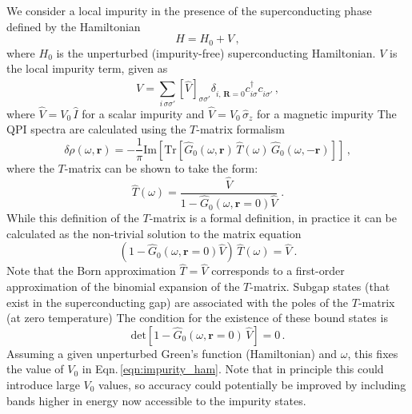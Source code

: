 \documentclass[aps,prb,twocolumn,superscriptaddress,nofootinbib]{revtex4-2}
\newcommand{\br}{\bm{r}}
\begin{document}
We consider a local impurity in the presence of the superconducting phase defined by the Hamiltonian
\begin{equation}
    H = H_0 + V \, ,
\end{equation}
where $H_0$ is the unperturbed (impurity-free) superconducting Hamiltonian. $V$ is the local impurity term, given as
\begin{equation} \label{eqn:impurity_ham}
    V = \sum_{i \, \sigma \sigma'} [ \hat V ]_{\sigma \sigma'}^{\phantom{\dagger}} \delta^{\phantom{\dagger}}_{i, \, \boldsymbol{R} = 0} c^\dagger_{i \sigma} c^{\phantom{\dagger}}_{i \sigma'} \, ,
\end{equation}
where $\hat V = V_0 \, \hat I$ for a scalar impurity and $\hat V = V_0 \, \hat \sigma_z$ for a magnetic impurity%
The QPI spectra are calculated using the $T$-matrix formalism%
\begin{equation} \label{eqn:qpi_rs}
    \delta \rho (\omega, \br) = - \frac{1}{\pi}  \text{Im} [  \text{Tr} [ \hat G_0 (\omega, \br) \, \hat T (\omega) \, \hat G_0 ( \omega, - \br) ] ] \, ,
\end{equation}
where the $T$-matrix can be shown to take the form:
\begin{equation}
    \hat T ( \omega ) = \frac{\hat V}{1- \hat G_0 (\omega, \br = 0) \hat V} \; .
\end{equation}
While this definition of the $T$-matrix is a formal definition, in practice it can be calculated as the non-trivial solution to the matrix equation
\begin{equation}
    (1- \hat G_0 (\omega, \br = 0) \hat V) \, \hat T ( \omega ) = \hat V\ .
\end{equation}
Note that the Born approximation $\hat T = \hat V$ corresponds to a first-order approximation of the binomial expansion of the $T$-matrix.
Subgap states (that exist in the superconducting gap) are associated with the poles of the $T$-matrix (at zero temperature)%
The condition for the existence of these bound states is
\begin{equation} \label{eqn:bound_evals}
    \text{det} [ 1 - \hat G_0 (\omega, \br = 0) \, \hat V ] = 0 \, .
\end{equation}
Assuming a given unperturbed Green's function (Hamiltonian) and $\omega$, this fixes the value of $V_0$ in Eqn.\,\eqref{eqn:impurity_ham}. Note that in principle this could introduce large $V_0$ values, so accuracy could potentially be improved by including bands higher in energy now accessible to the impurity states.
\end{document}
